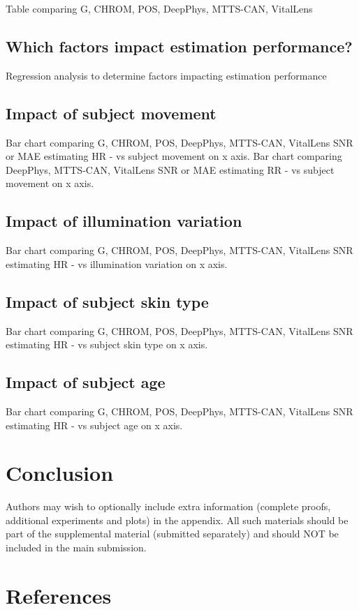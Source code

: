 \documentclass{article}
\begin{document}
Table comparing G, CHROM, POS, DeepPhys, MTTS-CAN, VitalLens

\subsection{Which factors impact estimation performance?}

Regression analysis to determine factors impacting estimation performance

\subsection{Impact of subject movement}

Bar chart comparing G, CHROM, POS, DeepPhys, MTTS-CAN, VitalLens SNR or MAE estimating HR - vs subject movement on x axis.
Bar chart comparing DeepPhys, MTTS-CAN, VitalLens SNR or MAE estimating RR - vs subject movement on x axis.

\subsection{Impact of illumination variation}

Bar chart comparing G, CHROM, POS, DeepPhys, MTTS-CAN, VitalLens SNR estimating HR - vs illumination variation on x axis.

\subsection{Impact of subject skin type}

Bar chart comparing G, CHROM, POS, DeepPhys, MTTS-CAN, VitalLens SNR estimating HR - vs subject skin type on x axis.

\subsection{Impact of subject age}

Bar chart comparing G, CHROM, POS, DeepPhys, MTTS-CAN, VitalLens SNR estimating HR - vs subject age on x axis.

\section{Conclusion}

Authors may wish to optionally include extra information (complete proofs, additional experiments and plots) in the appendix. All such materials should be part of the supplemental material (submitted separately) and should NOT be included in the main submission.

\section*{References}




\end{document}
